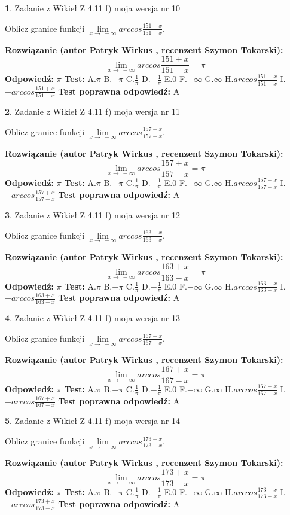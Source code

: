 \documentclass[12pt, a4paper]{article}
\theoremstyle{definition} %
\newtheorem{zad}{}
\newcommand{\zadStart}[1]{\begin{zad}#1\newline}
\newcommand{\zadStop}{\end{zad}}
\newcommand{\rozwStart}[2]{\noindent \textbf{Rozwiązanie (autor #1 , recenzent #2): }\newline}
\newcommand{\rozwStop}{\newline}
\newcommand{\odpStart}{\noindent \textbf{Odpowiedź:}\newline}
\newcommand{\odpStop}{\newline}
\newcommand{\testStart}{\noindent \textbf{Test:}\newline}
\newcommand{\testStop}{\newline}
\newcommand{\kluczStart}{\noindent \textbf{Test poprawna odpowiedź:}\newline}
\newcommand{\kluczStop}{\newline}
\begin{document}
\zadStart{Zadanie z Wikieł Z 4.11 f) moja wersja nr 10}

Oblicz granice funkcji $\lim\limits_{x\to\ -\infty}arccos\frac{151+x}{151-x}$.
\zadStop
\rozwStart{Patryk Wirkus}{Szymon Tokarski}
$$\lim\limits_{x\to\ -\infty}arccos\frac{151+x}{151-x} = \pi$$
\rozwStop
\odpStart
$\pi$
\odpStop
\testStart
A.$\pi$ B.$-\pi$ C.$\frac{1}{\pi}$ D.$-\frac{1}{\pi}$ E.$0$ F.$-\infty$ G.$\infty$ H.$arccos\frac{151+x}{151-x}$ I.$-arccos\frac{151+x}{151-x}$
\testStop
\kluczStart
A
\kluczStop



\zadStart{Zadanie z Wikieł Z 4.11 f) moja wersja nr 11}

Oblicz granice funkcji $\lim\limits_{x\to\ -\infty}arccos\frac{157+x}{157-x}$.
\zadStop
\rozwStart{Patryk Wirkus}{Szymon Tokarski}
$$\lim\limits_{x\to\ -\infty}arccos\frac{157+x}{157-x} = \pi$$
\rozwStop
\odpStart
$\pi$
\odpStop
\testStart
A.$\pi$ B.$-\pi$ C.$\frac{1}{\pi}$ D.$-\frac{1}{\pi}$ E.$0$ F.$-\infty$ G.$\infty$ H.$arccos\frac{157+x}{157-x}$ I.$-arccos\frac{157+x}{157-x}$
\testStop
\kluczStart
A
\kluczStop



\zadStart{Zadanie z Wikieł Z 4.11 f) moja wersja nr 12}

Oblicz granice funkcji $\lim\limits_{x\to\ -\infty}arccos\frac{163+x}{163-x}$.
\zadStop
\rozwStart{Patryk Wirkus}{Szymon Tokarski}
$$\lim\limits_{x\to\ -\infty}arccos\frac{163+x}{163-x} = \pi$$
\rozwStop
\odpStart
$\pi$
\odpStop
\testStart
A.$\pi$ B.$-\pi$ C.$\frac{1}{\pi}$ D.$-\frac{1}{\pi}$ E.$0$ F.$-\infty$ G.$\infty$ H.$arccos\frac{163+x}{163-x}$ I.$-arccos\frac{163+x}{163-x}$
\testStop
\kluczStart
A
\kluczStop



\zadStart{Zadanie z Wikieł Z 4.11 f) moja wersja nr 13}

Oblicz granice funkcji $\lim\limits_{x\to\ -\infty}arccos\frac{167+x}{167-x}$.
\zadStop
\rozwStart{Patryk Wirkus}{Szymon Tokarski}
$$\lim\limits_{x\to\ -\infty}arccos\frac{167+x}{167-x} = \pi$$
\rozwStop
\odpStart
$\pi$
\odpStop
\testStart
A.$\pi$ B.$-\pi$ C.$\frac{1}{\pi}$ D.$-\frac{1}{\pi}$ E.$0$ F.$-\infty$ G.$\infty$ H.$arccos\frac{167+x}{167-x}$ I.$-arccos\frac{167+x}{167-x}$
\testStop
\kluczStart
A
\kluczStop



\zadStart{Zadanie z Wikieł Z 4.11 f) moja wersja nr 14}

Oblicz granice funkcji $\lim\limits_{x\to\ -\infty}arccos\frac{173+x}{173-x}$.
\zadStop
\rozwStart{Patryk Wirkus}{Szymon Tokarski}
$$\lim\limits_{x\to\ -\infty}arccos\frac{173+x}{173-x} = \pi$$
\rozwStop
\odpStart
$\pi$
\odpStop
\testStart
A.$\pi$ B.$-\pi$ C.$\frac{1}{\pi}$ D.$-\frac{1}{\pi}$ E.$0$ F.$-\infty$ G.$\infty$ H.$arccos\frac{173+x}{173-x}$ I.$-arccos\frac{173+x}{173-x}$
\testStop
\kluczStart
A
\kluczStop
\end{document}
